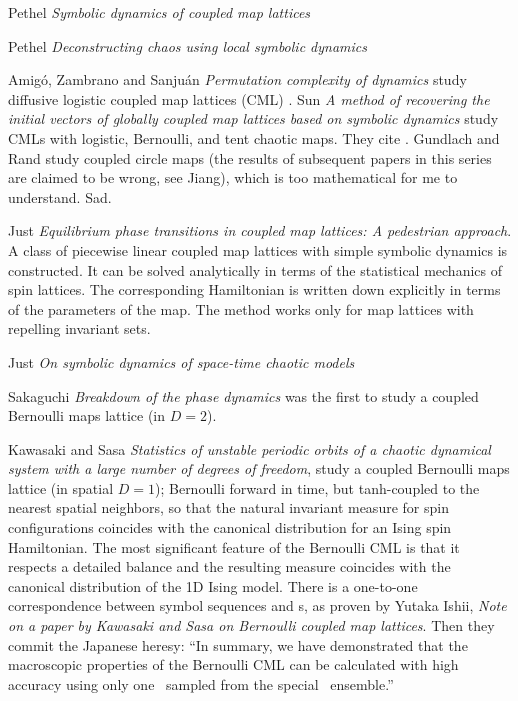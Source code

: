 \begin{description}
Pethel \etal{} {\em Symbolic dynamics of coupled map lattices}

Pethel \etal{}
{\em Deconstructing {\spt} chaos using local symbolic dynamics}

Amig{\'o}, Zambrano and Sanju{\'a}n
{\em Permutation complexity of {\spt} dynamics}
study diffusive logistic coupled map lattices
(CML) .
Sun \etal{} {\em A method of recovering the initial vectors
of globally coupled map lattices based on symbolic dynamics} study
CMLs with logistic, Bernoulli, and tent chaotic maps. They  cite
.
Gundlach and  Rand study coupled circle maps (the results of
subsequent papers in this series are claimed to be wrong, see
Jiang), which is too mathematical for me to understand. Sad.

Just {\em Equilibrium phase transitions in coupled map
lattices: {A} pedestrian approach}.
A class of piecewise linear coupled map lattices with simple symbolic
dynamics is constructed. It can be solved analytically in terms of the
statistical mechanics of spin lattices. The corresponding Hamiltonian is
written down explicitly in terms of the parameters of the map. The method
works only for map lattices with repelling invariant sets.

Just
{\em On symbolic dynamics of space-time chaotic models}

Sakaguchi {\em Breakdown of the phase dynamics}
was the first to study a coupled Bernoulli maps lattice (in $D=2$).

Kawasaki and Sasa {\em Statistics of unstable periodic orbits
of a chaotic dynamical system with a large number of degrees of freedom},
study a coupled Bernoulli maps lattice (in spatial $D=1$); Bernoulli
forward in time, but tanh-coupled to the nearest spatial neighbors, so
that the natural invariant measure for spin configurations coincides with
the canonical distribution for an Ising spin Hamiltonian. The most
significant feature of the Bernoulli CML is that it respects a detailed
balance and the resulting  measure coincides with the canonical
distribution of the 1D Ising model. There  is  a  one-to-one
correspondence  between symbol sequences and \po s,
as proven by
Yutaka Ishii, %
{\em Note on a paper by Kawasaki and Sasa on Bernoulli coupled map lattices}.
Then they commit the Japanese heresy: ``In summary, we have demonstrated
that the macroscopic properties of the Bernoulli CML can be calculated
with high accuracy using only one \po\ sampled from the special \po\
ensemble.''


\end{description}
